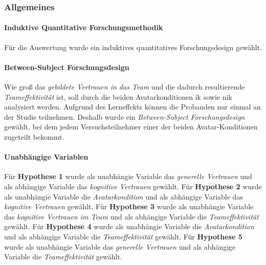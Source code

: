 \documentclass[a4paper,11pt]{article}%
\renewcommand{\\}{\vspace*{0.5\baselineskip} \newline}
\begin{document}
%
%			
%	

\subsubsection{Allgemeines}
			\paragraph{Induktive Quantitative Forschungsmethodik} Für die Auswertung wurde ein induktives quantitatives Forschungsdesign gewählt. 
			\paragraph{Between-Subject Forschungsdesign}
Wie groß das \textit{gebildete Vertrauen in das Team} und die dadurch resultierende \textit{Teameffektivität} ist, soll durch die beiden Avatarkonditionen \ac{ik} sowie \ac{nik} analysiert werden. Aufgrund des Lerneffekts können die Probanden nur einmal an der Studie teilnehmen. Deshalb wurde ein \textit{Between-Subject Forschungsdesign} gewählt, bei dem jedem Versuchsteilnehmer einer der beiden Avatar-Konditionen zugeteilt bekommt.
			\paragraph{Unabhängige Variablen}
Für \textbf{Hypothese 1} wurde als unabhängie Variable das \textit{generelle Vertrauen} und als abhängige Variable das \textit{kognitive Vertrauen} gewählt.
Für \textbf{Hypothese 2} wurde als unabhängie Variable die \textit{Avatarkondition} und als abhängige Variable das \textit{kognitive Vertrauen} gewählt.
Für \textbf{Hypothese 3} wurde als unabhängie Variable das \textit{kognitive Vertrauen im Team} und als abhängige Variable die \textit{Teameffektivität} gewählt.
Für \textbf{Hypothese 4} wurde als unabhängie Variable die \textit{Avatarkondition} und als abhängige Variable die \textit{Teameffektivität} gewählt.
Für \textbf{Hypothese 5} wurde als unabhängie Variable das \textit{generelle Vertrauen} und als abhängige Variable die \textit{Teameffektivität} gewählt.
\end{document}
